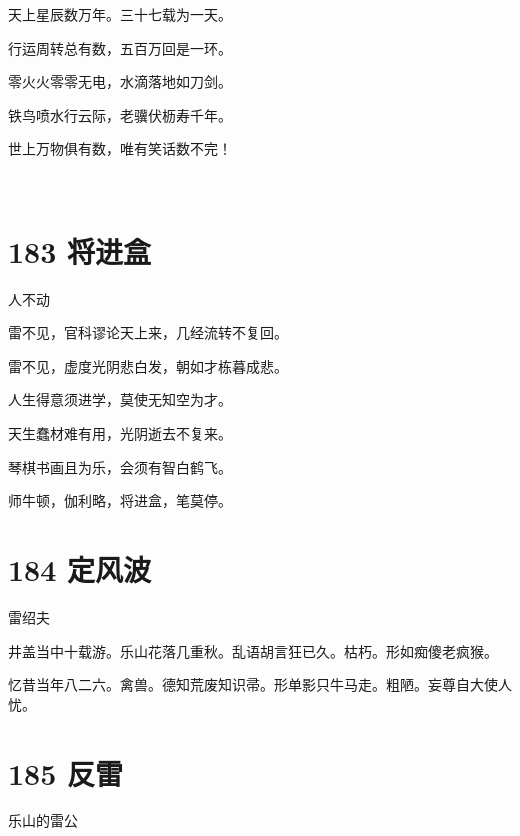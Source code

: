\documentclass[UTF8,12pt,oneside]{ctexbook}
\begin{document}
        \begin{center}
        天上星辰数万年。三十七载为一天。
        
        行运周转总有数，五百万回是一环。

        零火火零零无电，水滴落地如刀剑。
        
        铁鸟喷水行云际，老骥伏枥寿千年。

        世上万物俱有数，唯有笑话数不完！

        ~\\
        \end{center}

        \section{183 将进盒}
        \begin{center}
            人不动
        \end{center}
        
        \begin{center}
        雷不见，官科谬论天上来，几经流转不复回。
        
        雷不见，虚度光阴悲白发，朝如才栋暮成悲。
        
        人生得意须进学，莫使无知空为才。
        
        天生蠢材难有用，光阴逝去不复来。

        琴棋书画且为乐，会须有智白鹤飞。
        
        师牛顿，伽利略，将进盒，笔莫停。
        \end{center}

        \newpage

        \section{184 定风波}
        \begin{center}
            雷绍夫
        \end{center}
        
        井盖当中十载游。乐山花落几重秋。乱语胡言狂已久。枯朽。形如痴傻老疯猴。
        
        忆昔当年八二六。禽兽。德知荒废知识帚。形单影只牛马走。粗陋。妄尊自大使人忧。
        ~\\

        \section{185 反雷}
        \begin{center}
            乐山的雷公
        \end{center}
\end{document}
